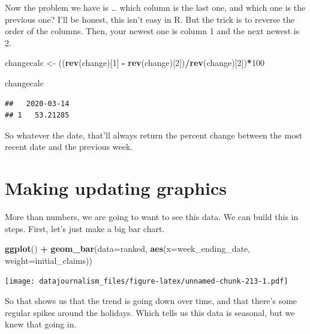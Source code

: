 \documentclass[]{book}
\newenvironment{Shaded}{\begin{snugshade}}{\end{snugshade}}
\newcommand{\DataTypeTok}[1]{\textcolor[rgb]{0.13,0.29,0.53}{#1}}
\newcommand{\DecValTok}[1]{\textcolor[rgb]{0.00,0.00,0.81}{#1}}
\newcommand{\KeywordTok}[1]{\textcolor[rgb]{0.13,0.29,0.53}{\textbf{#1}}}
\newcommand{\NormalTok}[1]{#1}
\newcommand{\OperatorTok}[1]{\textcolor[rgb]{0.81,0.36,0.00}{\textbf{#1}}}
\newcommand{\StringTok}[1]{\textcolor[rgb]{0.31,0.60,0.02}{#1}}
\begin{document}
Now the problem we have is \ldots{} which column is the last one, and which one is the previous one? I'll be honest, this isn't easy in R. But the trick is to reverse the order of the columns. Then, your newest one is column 1 and the next newest is 2.

\begin{Shaded}
\begin{Highlighting}[]
\NormalTok{changecalc <-}\StringTok{ }\NormalTok{((}\KeywordTok{rev}\NormalTok{(change)[}\DecValTok{1}\NormalTok{] }\OperatorTok{-}\StringTok{ }\KeywordTok{rev}\NormalTok{(change)[}\DecValTok{2}\NormalTok{])}\OperatorTok{/}\KeywordTok{rev}\NormalTok{(change)[}\DecValTok{2}\NormalTok{])}\OperatorTok{*}\DecValTok{100}

\NormalTok{changecalc}
\end{Highlighting}
\end{Shaded}

\begin{verbatim}
##   2020-03-14
## 1   53.21285
\end{verbatim}

So whatever the date, that'll always return the percent change between the most recent date and the previous week.

\hypertarget{making-updating-graphics}{%
\section{Making updating graphics}\label{making-updating-graphics}}

More than numbers, we are going to want to see this data. We can build this in steps. First, let's just make a big bar chart.

\begin{Shaded}
\begin{Highlighting}[]
\KeywordTok{ggplot}\NormalTok{() }\OperatorTok{+}\StringTok{ }
\StringTok{  }\KeywordTok{geom_bar}\NormalTok{(}\DataTypeTok{data=}\NormalTok{ranked, }\KeywordTok{aes}\NormalTok{(}\DataTypeTok{x=}\NormalTok{week_ending_date, }\DataTypeTok{weight=}\NormalTok{initial_claims)) }
\end{Highlighting}
\end{Shaded}

\texttt{[image: datajournalism\_files/figure-latex/unnamed-chunk-213-1.pdf]}

So that shows us that the trend is going down over time, and that there's some regular spikes around the holidays. Which tells us this data is seasonal, but we knew that going in.
\end{document}
